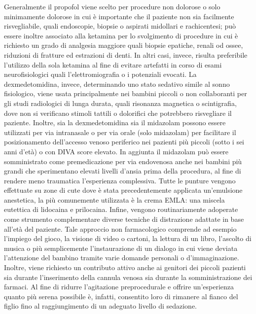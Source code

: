 Generalmente il propofol viene scelto per procedure non dolorose o solo minimamente dolorose in cui è importante che il paziente non sia facilmente risvegliabile, quali endoscopie, biopsie o aspirati midollari e rachicentesi; può essere inoltre associato alla ketamina per lo svolgimento di procedure in cui è richiesto un grado di analgesia maggiore quali biopsie epatiche, renali od ossee, riduzioni di fratture ed estrazioni di denti. In altri casi, invece, risulta preferibile l'utilizzo della sola ketamina al fine di evitare artefatti in corso di esami neurofisiologici quali l'elettromiografia o i potenziali evocati. La dexmedetomidina, invece, determinando uno stato sedativo simile al sonno fisiologico, viene usata principalmente nei bambini piccoli o non collaboranti per gli studi radiologici di lunga durata, quali risonanza magnetica o scintigrafia, dove non si verificano stimoli tattili o dolorifici che potrebbero risvegliare il paziente. Inoltre, sia la dexmedetomidina sia il midazolam possono essere utilizzati per via intranasale o per via orale (solo midazolam) per facilitare il posizionamento dell'accesso venoso periferico nei pazienti più piccoli (sotto i sei anni d'età) o con DIVA score elevato. In aggiunta il midazolam può essere somministrato come premedicazione per via endovenosa anche nei bambini più grandi che sperimentano elevati livelli d'ansia prima della procedura, al fine di rendere meno traumatica l'esperienza complessiva. Tutte le punture vengono effettuate su zone di cute dove è stata precedentemente applicata un'emulsione anestetica, la più comunemente utilizzata è la crema EMLA: una miscela eutettica di lidocaina e prilocaina. Infine, vengono routinariamente adoperate come strumento complementare diverse tecniche di distrazione adattate in base all'età del paziente. Tale approccio non farmacologico comprende ad esempio l'impiego del gioco, la visione di video o cartoni, la lettura di un libro, l'ascolto di musica o più semplicemente l'instaurazione di un dialogo in cui viene deviata l'attenzione del bambino tramite varie domande personali o d'immaginazione. Inoltre, viene richiesto un contributo attivo anche ai genitori dei piccoli pazienti sia durante l'inserimento della cannula venosa sia durante la somministrazione dei farmaci. Al fine di ridurre l'agitazione preprocedurale e offrire un'esperienza quanto più serena possibile è, infatti, consentito loro di rimanere al fianco del figlio fino al raggiungimento di un adeguato livello di sedazione. 

